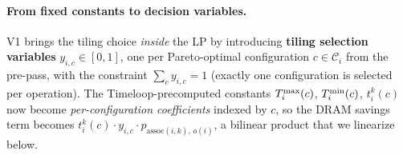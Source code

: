\paragraph{From fixed constants to decision variables.}
V1 brings the tiling choice \emph{inside} the LP by introducing \textbf{tiling selection variables} $y_{i,c} \in [0,1]$, one per Pareto-optimal configuration $c \in \mathcal{C}_i$ from the pre-pass, with the constraint $\sum_c y_{i,c} = 1$ (exactly one configuration is selected per operation). The Timeloop-precomputed constants $T^{\max}_i(c)$, $T^{\min}_i(c)$, $t_i^k(c)$ now become \emph{per-configuration coefficients} indexed by $c$, so the DRAM savings term becomes $t_i^k(c) \cdot y_{i,c} \cdot p_{\text{assoc}(i,k),\, o(i)}$, a bilinear product that we linearize below.
 


